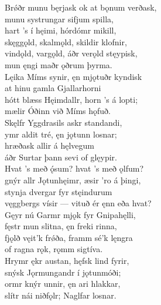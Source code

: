 \bva Brǿðr munu bęrjask \hld ok at bǫnum verðask, \\%
munu systrungar \hld sifjum spilla, \\%
hart ’s í hęimi, \hld hórdómr mikill, \\%
skęggǫld, skalmǫld, \hld skildir klofnir, \\%
vindǫld, vargǫld, \hld áðr verǫld stęypisk,\footnotemark[1] \\%
mun ęngi maðr \hld ǫðrum þyrma.
\\%

\bva Lęika Míms synir, \hld ęn mjǫtuðr kyndisk \\%
at hinu gamla \hld Gjallarhorni \\%
hótt blæss Hęimdallr, \hld horn ’s á lopti; \\%
mælir Óðinn \hld við Míms hǫfuð.\\%

\bva Skęlfr Yggdrasils \hld askr standandi, \\%
ymr aldit tré, \hld ęn jǫtunn losnar; \\%
hræðask allir \hld á hęlvegum \\%
áðr Surtar þann \hld sevi of glęypir.\\%

\bva Hvat ’s með ǫ́sum? \hld hvat ’s með ǫlfum? \\%
gnýr allr Jǫtunhęimr, \hld æsir ’ro á þingi, \\%
stynja dvergar \hld fyr stęindurum \\%
vęggbergs vísir — \hld vituð ér ęnn eða hvat?\\%

\bva Gęyr nú Garmr mjǫk \hld fyr Gnipahęlli, \\%
fęstr mun slitna, \hld ęn freki rinna, \\%
fjǫlð vęit'k frǿða, \hld framm sé'k lęngra \\%
of ragna rǫk, \hld rǫmm sigtíva.\\%

\bva Hrymr ękr austan, \hld hęfsk lind fyrir, \\%
snýsk Jǫrmungandr \hld í jǫtunmóði; \\%
ormr knýr unnir, \hld ęn ari hlakkar, \\%
slítr nái niðfǫlr; \hld Naglfar losnar.\\%

